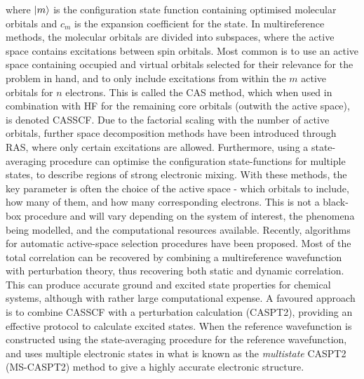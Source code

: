 where $\ket{m}$ is the configuration state function containing optimised molecular orbitals and $c_{m}$ is the expansion coefficient for the state. In multireference methods, the molecular orbitals are divided into subspaces, where the active space contains excitations between spin orbitals. Most common is to use an active space containing occupied and virtual orbitals selected for their relevance for the problem in hand, and to only include excitations from within the $m$ active orbitals for $n$  electrons. This is called the \ac{CAS} method, which when used in combination with \ac{HF} for the remaining core orbitals (outwith the active space), is denoted \ac{CASSCF}.\cite{Roos1980} Due to the factorial scaling with the number of active orbitals, further space decomposition methods have been introduced through \ac{RAS}, where only certain excitations are allowed. Furthermore, using a state-averaging procedure can optimise the configuration state-functions for multiple states, to describe regions of strong electronic mixing. With these methods, the key parameter is often the choice of the active space - which orbitals to include, how many of them, and how many corresponding electrons. This is not a black-box procedure and will vary depending on the system of interest, the phenomena being modelled, and the computational resources available.\cite{Lischka2018} Recently, algorithms for automatic active-space selection procedures have been proposed.\cite{Stein2016,Bao2018} Most of the total correlation can be recovered by combining a multireference wavefunction with perturbation theory, thus recovering both static and dynamic correlation. This can produce accurate ground and excited state properties for chemical systems, although with rather large computational expense.\cite{Ramos-Cordoba2017,Stein2016a} A favoured approach is to combine \ac{CAS}\ac{SCF} with a perturbation calculation (\ac{CAS}\ac{PT2}), providing an effective protocol to calculate excited states.\cite{Andersson1992} When the reference wavefunction is constructed using the state-averaging procedure for the reference wavefunction, and uses multiple electronic states in what is known as the  \textit{multistate} CASPT2 (MS-CASPT2) method to give a highly accurate electronic structure.\cite{FINLEY1998299}

